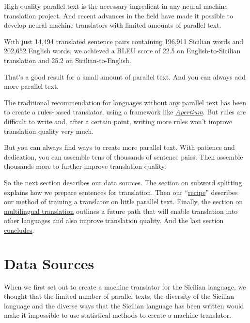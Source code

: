 \documentclass[10pt,letterpaper]{article}
\begin{document}
High-quality parallel text is the necessary ingredient in any neural machine translation project.
And recent advances in the field have made it possible to develop neural machine translators with
limited amounts of parallel text.

With just 14,494 translated sentence pairs containing 196,911 Sicilian words and
202,652 English words, we achieved a BLEU score of 22.5 on English-to-Sicilian
translation and 25.2 on Sicilian-to-English.
      
That's a good result for a small amount of parallel text.  And you can always add more parallel text.

The traditional recommendation for languages without any parallel text has been to create
a rules-based translator, using a framework like
\href{https://www.apertium.org/}{\textit{Apertium}}.
But rules are difficult to write and, after a certain point,
writing more rules won't improve translation quality very much.

But you can always find ways to create more parallel text.
With patience and dedication, you can assemble tens of thousands of sentence pairs.
Then assemble thousands more to further improve translation quality.

So the next section describes our \hyperlink{data}{data sources}.  The section on
\hyperlink{subword}{subword splitting} explains how we prepare sentences for translation.
Then our ``\hyperlink{recipe}{recipe}'' describes our method of training a translator on little parallel text.
Finally, the section on \hyperlink{multilingual}{multilingual translation} outlines a future path
that will enable translation into other languages and also improve translation quality.
And the last section \hyperlink{conclusion}{concludes}.



\hypertarget{data}{}

\section*{Data Sources}

When we first set out to create a machine translator for the Sicilian language,
we thought that the limited number of parallel texts, the diversity of the Sicilian
language and the diverse ways that the Sicilian language has been written would make
it impossible to use statistical methods to create a machine translator.
\end{document}

